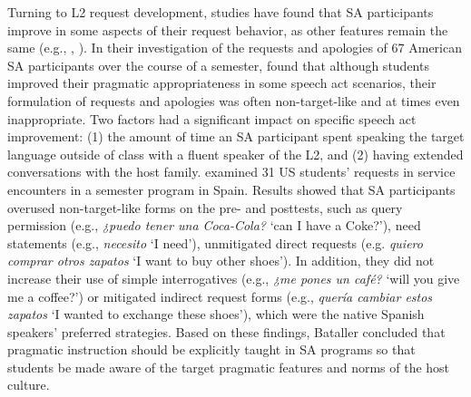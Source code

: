 \documentclass[output=paper]{langscibook}
\begin{document}
  Turning to L2 request development, studies have found that SA participants improve in some aspects of their request behavior, as other features remain the same (e.g., \citealt{Barron2003}, \citealt{Barron2006,Bataller2010,ColeAnderson2001,Han2005,ShivelyCohen2008}). In their investigation of the requests and apologies of 67 American SA participants over the course of a semester, \citet{ShivelyCohen2008} found that although students improved their pragmatic appropriateness in some speech act scenarios, their formulation of requests and apologies was often non-target-like and at times even inappropriate. Two factors had a significant impact on specific speech act improvement:
  (1) the amount of time an SA participant spent speaking the target language outside of class with a fluent speaker of the L2, and
  (2) having extended conversations with the host family. \citet{Bataller2010} examined 31 US students’ requests in service encounters in a semester program in Spain. Results showed that SA participants overused non-target-like forms on the pre- and posttests, such as query permission (e.g., \textit{¿puedo tener una Coca-Cola?} ‘can I have a Coke?’), need statements (e.g., \textit{necesito} ‘I need’), unmitigated direct requests (e.g. \textit{quiero comprar otros zapatos} ‘I want to buy other shoes’). In addition, they did not increase their use of simple interrogatives (e.g., \textit{¿me pones un café?} ‘will you give me a coffee?’) or mitigated indirect request forms (e.g., \textit{quería cambiar estos zapatos} ‘I wanted to exchange these shoes’), which were the native Spanish speakers’ preferred strategies. Based on these findings, Bataller concluded that pragmatic instruction should be explicitly taught in SA programs so that students be made aware of the target pragmatic features and norms of the host culture.
\end{document}
